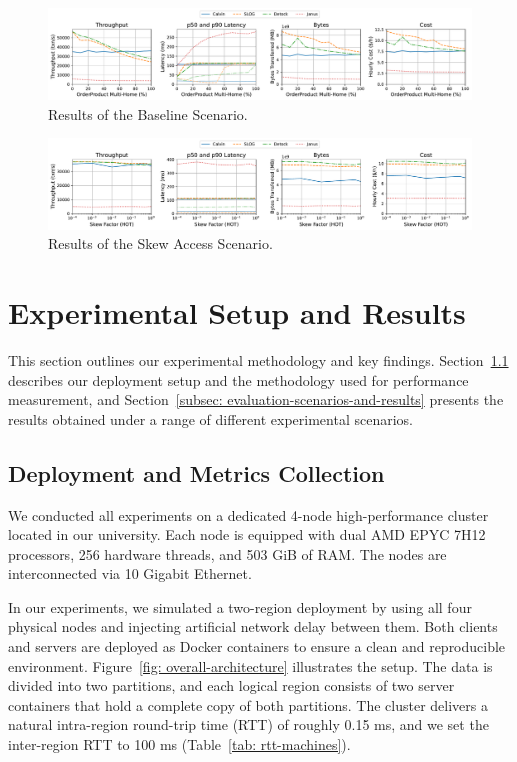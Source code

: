 \begin{figure}[t]
    \centering
    \includegraphics[width=1\textwidth]{figures/Baseline.pdf}
    \caption{Results of the Baseline Scenario.}
    \label{fig: baseline-scenario}
\end{figure}

\begin{figure}[t]
    \centering
    \includegraphics[width=1\textwidth]{figures/Skew.pdf}
    \caption{Results of the Skew Access Scenario.}
    \label{fig: skew-access-scenario}
\end{figure}

\section{Experimental Setup and Results}
\label{sec: experimental-setup-and-results}
This section outlines our experimental methodology and key findings. Section~\ref{subsec: deployment-and-metrics-collection} describes our deployment setup and the methodology used for performance measurement, and Section~\ref{subsec: evaluation-scenarios-and-results} presents the results obtained under a range of different experimental scenarios.

\subsection{Deployment and Metrics Collection}
\label{subsec: deployment-and-metrics-collection}
We conducted all experiments on a dedicated 4-node high-performance cluster located in our university. Each node is equipped with dual AMD EPYC 7H12 processors, 256 hardware threads, and 503 GiB of RAM. The nodes are interconnected via 10 Gigabit Ethernet.

In our experiments, we simulated a two-region deployment by using all four physical nodes and injecting artificial network delay between them. Both clients and servers are deployed as Docker containers to ensure a clean and reproducible environment. Figure~\ref{fig: overall-architecture} illustrates the setup. The data is divided into two partitions, and each logical region consists of two server containers that hold a complete copy of both partitions. The cluster delivers a natural intra-region round-trip time (RTT) of roughly 0.15 ms, and we set the inter-region RTT to 100 ms (Table~\ref{tab: rtt-machines}).


